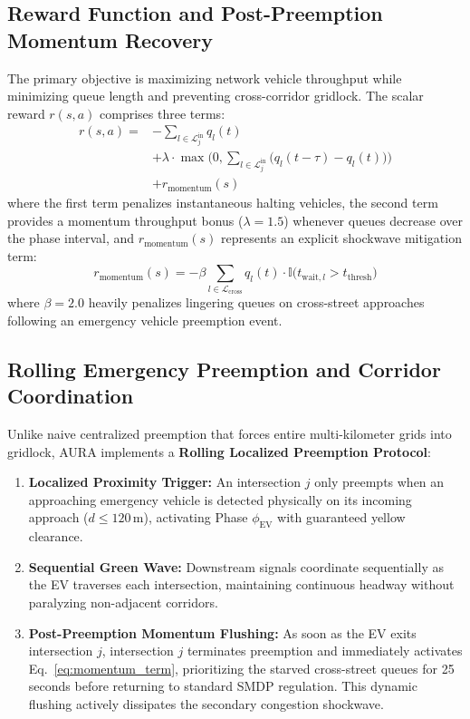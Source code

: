 \subsection{Reward Function and Post-Preemption Momentum Recovery}
The primary objective is maximizing network vehicle throughput while minimizing queue length and preventing cross-corridor gridlock. The scalar reward $r(s, a)$ comprises three terms:
\begin{equation}
\begin{aligned}
r(s, a) = &-\sum_{l \in \mathcal{L}_j^{\text{in}}} q_l(t) \\
&+ \lambda \cdot \max\Big(0, \sum_{l \in \mathcal{L}_j^{\text{in}}} \big(q_l(t-\tau) - q_l(t)\big) \Big) \\
&+ r_{\text{momentum}}(s)
\end{aligned}
\label{eq:reward}
\end{equation}
where the first term penalizes instantaneous halting vehicles, the second term provides a momentum throughput bonus ($\lambda = 1.5$) whenever queues decrease over the phase interval, and $r_{\text{momentum}}(s)$ represents an explicit shockwave mitigation term:
\begin{equation}
r_{\text{momentum}}(s) = - \beta \sum_{l \in \mathcal{L}_{\text{cross}}} q_l(t) \cdot \mathbb{I}\big(t_{\text{wait}, l} > t_{\text{thresh}}\big)
\label{eq:momentum_term}
\end{equation}
where $\beta = 2.0$ heavily penalizes lingering queues on cross-street approaches following an emergency vehicle preemption event.

\subsection{Rolling Emergency Preemption and Corridor Coordination}
Unlike naive centralized preemption that forces entire multi-kilometer grids into gridlock, AURA implements a \textbf{Rolling Localized Preemption Protocol}:
\begin{enumerate}
    \item \textbf{Localized Proximity Trigger:} An intersection $j$ only preempts when an approaching emergency vehicle is detected physically on its incoming approach ($d \le 120\,\text{m}$), activating Phase $\phi_{\text{EV}}$ with guaranteed yellow clearance.
    \item \textbf{Sequential Green Wave:} Downstream signals coordinate sequentially as the EV traverses each intersection, maintaining continuous headway without paralyzing non-adjacent corridors.
    \item \textbf{Post-Preemption Momentum Flushing:} As soon as the EV exits intersection $j$, intersection $j$ terminates preemption and immediately activates Eq.~\eqref{eq:momentum_term}, prioritizing the starved cross-street queues for 25 seconds before returning to standard SMDP regulation. This dynamic flushing actively dissipates the secondary congestion shockwave.
\end{enumerate}

